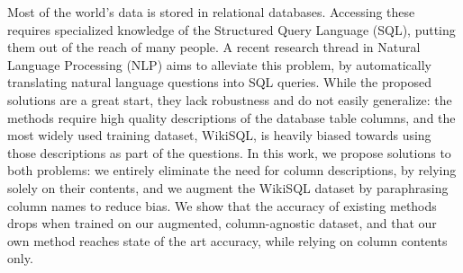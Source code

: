 Most of the world's data is stored in relational databases. Accessing these requires specialized knowledge of the Structured Query Language (SQL), putting them out of the reach of many people. A recent research thread in Natural Language Processing (NLP) aims to alleviate this problem, by automatically translating natural language questions into SQL queries. While the proposed solutions are a great start, they lack robustness and do not easily generalize: the methods require high quality descriptions of the database table columns, and the most widely used training dataset, WikiSQL, is heavily biased towards using those descriptions as part of the questions. In this work, we propose solutions to both problems: we entirely eliminate the need for column descriptions, by relying solely on their contents, and we augment the WikiSQL dataset by paraphrasing column names to reduce bias. We show that the accuracy of existing methods drops when trained on our augmented, column-agnostic dataset, and that our own method reaches state of the art accuracy, while relying on column contents only.
